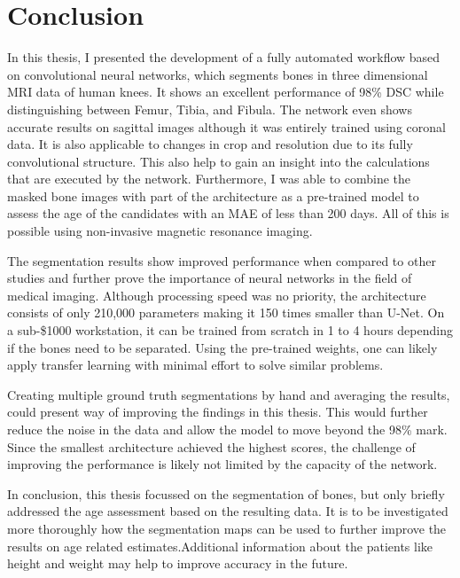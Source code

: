 \section{Conclusion}

In this thesis, I presented the development of a fully automated workflow based on convolutional neural networks, which segments bones in three dimensional MRI data of human knees. It shows an excellent performance of 98\% DSC while distinguishing between Femur, Tibia, and Fibula. The network even shows accurate results on sagittal images although it was entirely trained using coronal data. It is also applicable to changes in crop and resolution due to its fully convolutional structure. This also help to gain an insight into the calculations that are executed by the network. Furthermore, I was able to combine the masked bone images with part of the architecture as a pre-trained model to assess the age of the candidates with an MAE of less than 200 days. All of this is possible using non-invasive magnetic resonance imaging.

The segmentation results show improved performance when compared to other studies and further prove the importance of neural networks in the field of medical imaging. Although processing speed was no priority, the architecture consists of only 210,000 parameters making it 150 times smaller than U-Net. On a sub-\$1000 workstation, it can be trained from scratch in 1 to 4 hours depending if the bones need to be separated. Using the pre-trained weights, one can likely apply transfer learning with minimal effort to solve similar problems.

Creating multiple ground truth segmentations by hand and averaging the results, could present way of improving the findings in this thesis. This would further reduce the noise in the data and allow the model to move beyond the 98\% mark. Since the smallest architecture achieved the highest scores, the challenge of improving the performance is likely not limited by the capacity of the network.

In conclusion, this thesis focussed on the segmentation of bones, but only briefly addressed the age assessment based on the resulting data. It is to be investigated more thoroughly how the segmentation maps can be used to further improve the results on age related estimates.Additional information about the patients like height and weight may help to improve accuracy in the future.

\newpage